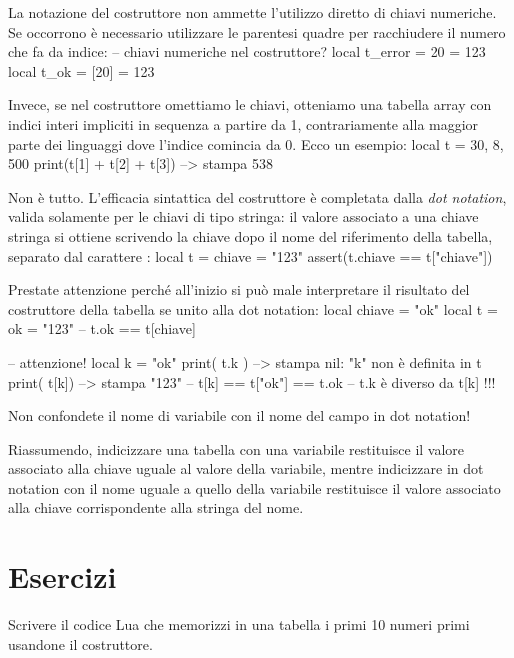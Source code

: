 La notazione del costruttore non ammette l'utilizzo diretto di chiavi
numeriche. Se occorrono è necessario utilizzare le parentesi quadre per
racchiudere il numero che fa da indice:
\lines
-- chiavi numeriche nel costruttore?
local t_error = { 20 = 123 }
local t_ok = { [20] = 123 }
\endlines
{}

Invece, se nel costruttore omettiamo le chiavi, otteniamo una tabella array con
indici interi impliciti in sequenza a partire da 1, contrariamente alla maggior
parte dei linguaggi dove l'indice comincia da 0. Ecco un esempio:
\lines
local t = { 30, 8, 500 }
print(t[1] + t[2] + t[3]) --> stampa 538
\endlines
{}

Non è tutto. L'efficacia sintattica del costruttore è completata dalla
\emph{dot notation}, valida solamente per le chiavi di tipo stringa:
il valore associato a una chiave stringa si ottiene scrivendo la chiave dopo
il nome del riferimento della tabella, separato dal carattere :
\lines
local t = { chiave = "123" }
assert(t.chiave == t["chiave"])
\endlines
{}

Prestate attenzione perché all'inizio si può male interpretare il risultato del
costruttore della tabella se unito alla dot notation:
\lines
local chiave = "ok"
local t = { ok = "123"} -- t.ok == t[chiave]

-- attenzione!
local k = "ok"
print( t.k ) --> stampa nil: "k" non è definita in t
print( t[k]) --> stampa "123"
-- t[k] == t["ok"] == t.ok
-- t.k è diverso da t[k] !!!
\endlines
{}

Non confondete il nome di variabile con il nome del campo in dot notation!

Riassumendo, indicizzare una tabella con una variabile restituisce il valore
associato alla chiave uguale al valore della variabile, mentre indicizzare in
dot notation con il nome uguale a quello della variabile restituisce il valore
associato alla chiave corrispondente alla stringa del nome.


\section{Esercizi}

\begin{Exercise}[label={tab-01}]
Scrivere il codice Lua che memorizzi in una tabella i primi 10 numeri primi
usandone il costruttore.
\end{Exercise}

